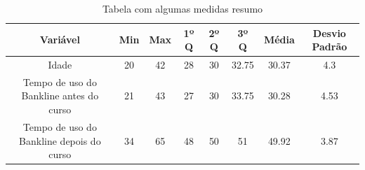 \documentclass[]{article}
\begin{document}
\begin{table}[h!]
  \begin{center}
  \caption{Tabela com algumas medidas resumo}
    \begin{tabular}{c|c|c|c|c|c|c|c}
    \hline
      \textbf{Variável} & \textbf{Min} & \textbf{Max} & \textbf{1º Q} & \textbf{2º Q} & \textbf{3º Q} & \textbf{Média}  & \textbf{Desvio Padrão} \\
      \hline
      Idade & 20 & 42 & 28 & 30 & 32.75 & 30.37 & 4.3\\
      Tempo de uso do Bankline antes do curso & 21 & 43 & 27 & 30 & 33.75 & 30.28 & 4.53\\
      Tempo de uso do Bankline depois do curso & 34 & 65 & 48 & 50 & 51 & 49.92 & 3.87 \\ 
      \hline
    \end{tabular}
     \label{table:tab2}
  \end{center}
\end{table}
\end{document}
